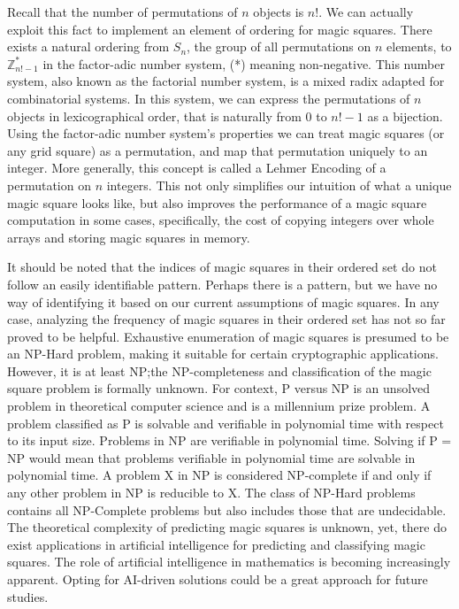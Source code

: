 \documentclass{rhumj_new}
\begin{document}
Recall that the number of permutations of $n$ objects is $n$!. We can actually exploit this fact to
implement an element of ordering for magic squares. There exists a natural ordering from $S_n$, the
group of all permutations on $n$ elements, to $\mathbb{Z}^{*}_{n!-1}$  in the factor-adic number
system, (*) meaning non-negative. This number system, also known as the factorial number system, is
a mixed radix adapted for combinatorial systems. In this system, we can express the permutations of
$n$ objects in lexicographical order, that is naturally from $0$ to $n!-1$ as a bijection. Using
the factor-adic number system's properties we can treat magic squares (or any grid square) as a
permutation, and map that permutation uniquely to an integer. More generally, this concept is
called a Lehmer Encoding of a permutation on $n$ integers\cite{Lehmer}. This not only simplifies
our intuition of what a unique magic square looks like, but also improves the performance of a
magic square computation in some cases, specifically, the cost of copying integers over whole
arrays and storing magic squares in memory.

It should be noted that the indices of magic squares in their ordered set do not follow an easily
identifiable pattern. Perhaps there is a pattern, but we have no way of identifying it based on our
current assumptions of magic squares. In any case, analyzing the frequency of magic squares in
their ordered set has not so far proved to be helpful. Exhaustive enumeration of magic squares is
presumed to be an NP-Hard problem, making it suitable for certain cryptographic applications.
However, it is at least NP;\@ the NP-completeness and classification of the magic square problem is
formally unknown. For context, P versus NP is an unsolved problem in theoretical computer science
and is a millennium prize problem. A problem classified as P is solvable and verifiable in
polynomial time with respect to its input size. Problems in NP are verifiable in polynomial time.
Solving if P = NP would mean that problems verifiable in polynomial time are solvable in polynomial
time. A problem X in NP is considered NP-complete if and only if any other problem in NP is
reducible to X. The class of NP-Hard problems contains all NP-Complete problems but also includes
those that are undecidable. The theoretical complexity of predicting magic squares is unknown, yet,
there do exist applications in artificial intelligence for predicting and classifying magic
squares\cite{Weed}. The role of artificial intelligence in mathematics is becoming increasingly
apparent. Opting for AI-driven solutions could be a great approach for future studies.
\end{document}
